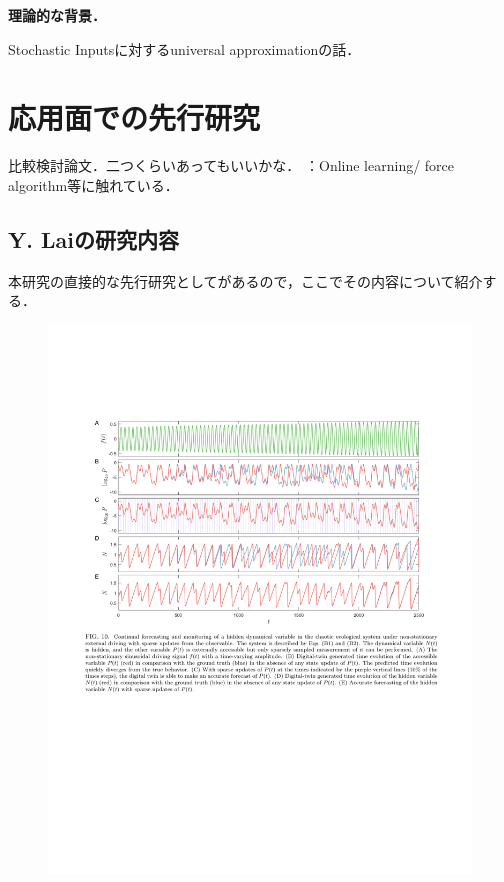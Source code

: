 \textbf{理論的な背景．}
\cite{grigoryevaChaosCompactManifolds2021}
\cite{grigoryevaLearningStrangeAttractors2023}
\cite{berryLearningTheoryDynamical2023a}

Stochastic Inputsに対するuniversal approximationの話．
\cite{grigoryevaUniversalDiscretetimeReservoir2018}




\clearpage
\section{応用面での先行研究}


比較検討論文．二つくらいあってもいいかな．
\cite{zhangSurveyReservoirComputing2023}：Online learning/ force algorithm等に触れている．



\subsection{Y. Laiの研究内容}
本研究の直接的な先行研究として\cite{kongDigitalTwinsNonlinear2022}があるので，ここでその内容について紹介する．

\begin{figure}[h]
    \includegraphics[width=\textwidth]{images/lai_result.pdf}
    \caption{}
\end{figure}  


\clearpage